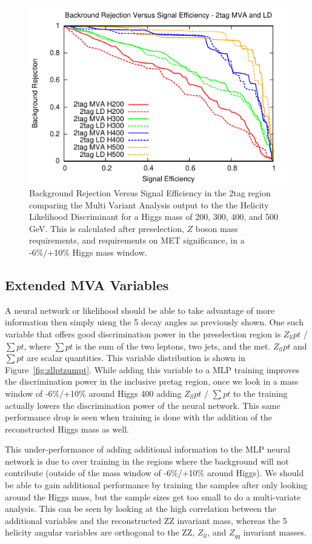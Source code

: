 \begin{figure}[htb!]
\begin{center}
\centerline{
\includegraphics[width=0.6\linewidth]{Optimization/plots/NN/2tag_MVA_LD_ROC.pdf}
}
\caption{
Background Rejection Versus Signal Efficiency in the 2tag region comparing the Multi Variant Analysis output to the the Helicity Likelihood Discriminant for a Higgs mass of 200, 300, 400, and 500 GeV. This is calculated after preselection, $Z$ boson mass requirements, and requirements on MET significance, in a -6\%/+10\% Higgs mass window.
}
\label{fig:nn_2tag_ROC}
\end{center}
\end{figure}



\subsection{Extended MVA Variables}

A neural network or likelihood should be able to take advantage of more information then simply uisng the 5 decay angles as previously shown. One such variable that offers good discrimination power in the preselection region is $Z_{ll}pt$ / $\sum{pt}$, where $\sum{pt}$ is the sum of the two leptons, two jets, and the met. $Z_{ll}pt$ and $\sum{pt}$ are scalar quantities.  This variable distribution is shown in Figure~\ref{fig:zllptzumpt}. While adding this variable to a MLP training improves the discrimination power in the inclusive pretag region, once we look in a mass window of -6\%/+10\% around Higgs 400 adding $Z_{ll}pt$ / $\sum{pt}$ to the training actually lowers the discrimination power of the neural network. This same performance drop is seen when training is done with the addition of the reconstructed Higgs mass as well.

This under-performance of adding additional information to the MLP neural network is due to over training in the regions where the background will not contribute (outside of the mass window of -6\%/+10\% around Higgs).  We should be able to gain additional performance by training the samples after only looking around the Higgs mass, but the sample sizes get too small to do a multi-variate analysis.  This can be seen by looking at the high correlation between the additional variables and the reconstructed ZZ invariant mass, whereas the 5 helicity angular variables are orthogonal to the ZZ, $Z_{ll}$, and $Z_{qq}$ invariant masses.  




